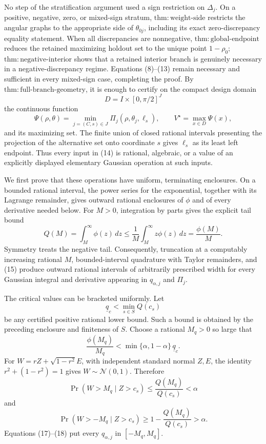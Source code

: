 No step of the stratification argument used a sign restriction on \(\Delta_j\).  On a positive, negative, zero, or mixed-sign stratum, \(\mathrm{thm{:}weight\mbox{-}side}\) restricts the angular graphs to the appropriate side of \(\theta_{0j}\), including its exact zero-discrepancy equality statement.  When all discrepancies are nonnegative, \(\mathrm{thm{:}global\mbox{-}endpoint}\) reduces the retained maximizing holdout set to the unique point \(1-\rho_0\); \(\mathrm{thm{:}negative\mbox{-}interior}\) shows that a retained interior branch is genuinely necessary in a negative-discrepancy regime.  Equations (8)--(13) remain necessary and sufficient in every mixed-sign case, completing the proof.
By \(\mathrm{thm{:}full\mbox{-}branch\mbox{-}geometry}\), it is enough to certify on the compact design domain
\[
D=I\times[0,\pi/2]^J
\]
the continuous function
\[
\Psi(\rho,\theta)
=\min_{j=(C,s)\in J}\Pi_j(\rho,\theta_j,\ell_s),
\qquad
V^{\star}=\max_{x\in D}\Psi(x),                                  \tag{14}
\]
and its maximizing set.  The finite union of closed rational intervals presenting the projection of the alternative set onto coordinate \(s\) gives \(\ell_s\) as its least left endpoint.  Thus every input in (14) is rational, algebraic, or a value of an explicitly displayed elementary Gaussian operation at such inputs.

We first prove that these operations have uniform, terminating enclosures.  On a bounded rational interval, the power series for the exponential, together with its Lagrange remainder, gives outward rational enclosures of \(\phi\) and of every derivative needed below.  For \(M>0\), integration by parts gives the explicit tail bound
\[
Q(M)=\int_M^{\infty}\phi(z)\,dz
\leq \frac{1}{M}\int_M^{\infty}z\phi(z)\,dz
=\frac{\phi(M)}{M}.                                                \tag{15}
\]
Symmetry treats the negative tail.  Consequently, truncation at a computably increasing rational \(M\), bounded-interval quadrature with Taylor remainders, and (15) produce outward rational intervals of arbitrarily prescribed width for every Gaussian integral and derivative appearing in \(q_{\alpha,j}\) and \(\Pi_j\).

The critical values can be bracketed uniformly.  Let
\[
\underline q_c<\min_{s\in S}Q(c_s)
\]
be any certified positive rational lower bound.  Such a bound is obtained by the preceding enclosure and finiteness of \(S\).  Choose a rational \(M_q>0\) so large that
\[
\frac{\phi(M_q)}{M_q}
<\min\{\alpha,1-\alpha\}\,\underline q_c.                        \tag{16}
\]
For \(W=rZ+\sqrt{1-r^2}E\), with independent standard normal \(Z,E\), the identity \(r^2+(1-r^2)=1\) gives \(W\sim\mathcal N(0,1)\).  Therefore
\[
\Pr(W>M_q\mid Z>c_s)
\leq \frac{Q(M_q)}{Q(c_s)}<\alpha                                  \tag{17}
\]
and
\[
\Pr(W>-M_q\mid Z>c_s)
\geq 1-\frac{Q(M_q)}{Q(c_s)}>\alpha.                               \tag{18}
\]
Equations (17)--(18) put every \(q_{\alpha,j}\) in \([-M_q,M_q]\).


